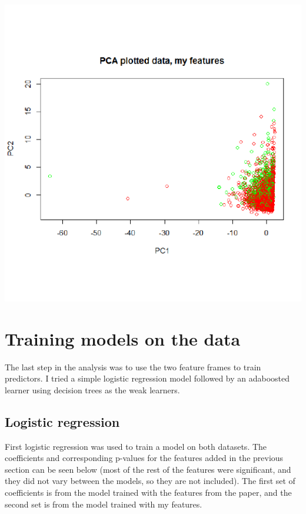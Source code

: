 \documentclass{article}\usepackage[]{graphicx}\usepackage[]{color}
\makeatletter
\def\maxwidth{ %
  \ifdim\Gin@nat@width>\linewidth
    \linewidth
  \else
    \Gin@nat@width
  \fi
}
\newenvironment{knitrout}{}{} %
\makeatother
\begin{document}
\begin{knitrout}
\color{fgcolor}

{\centering \includegraphics[width=\maxwidth]{figure/unnamed-chunk-12-1} 

}



\end{knitrout}


\newpage

\section{Training models on the data}

The last step in the analysis was to use the two feature frames to train predictors. I tried a simple logistic regression model followed by an adaboosted learner using decision trees as the weak learners.

\subsection{Logistic regression}

First logistic regression was used to train a model on both datasets. The coefficients and corresponding p-values for the features added in the previous section can be seen below (most of the rest of the features were significant, and they did not vary between the models, so they are not included). The first set of coefficients is from the model trained with the features from the paper, and the second set is from the model trained with my features.
\end{document}
